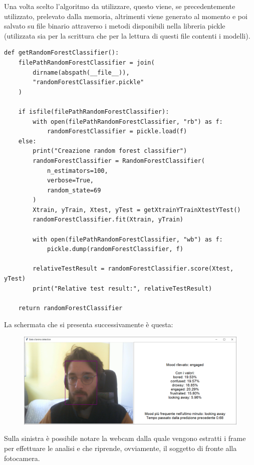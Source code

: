 Una volta scelto l’algoritmo da utilizzare, questo viene, se precedentemente utilizzato, prelevato dalla memoria, altrimenti viene generato al momento e poi salvato su file binario attraverso i metodi disponibili nella libreria pickle (utilizzata sia per la scrittura che per la lettura di questi file contenti i modelli).
\begin{verbatim}
def getRandomForestClassifier():
    filePathRandomForestClassifier = join(
        dirname(abspath(__file__)), 
        "randomForestClassifier.pickle"
    )

    if isfile(filePathRandomForestClassifier):
        with open(filePathRandomForestClassifier, "rb") as f:
            randomForestClassifier = pickle.load(f)
    else:
        print("Creazione random forest classifier")
        randomForestClassifier = RandomForestClassifier(
            n_estimators=100, 
            verbose=True, 
            random_state=69
        )
        Xtrain, yTrain, Xtest, yTest = getXtrainYTrainXtestYTest()
        randomForestClassifier.fit(Xtrain, yTrain)

        with open(filePathRandomForestClassifier, "wb") as f:
            pickle.dump(randomForestClassifier, f)
        
        relativeTestResult = randomForestClassifier.score(Xtest, yTest)
        print("Relative test result:", relativeTestResult)

    return randomForestClassifier
\end{verbatim}
La schermata che si presenta successivamente è questa:
\begin{figure}
    \begin{center}    
        \includegraphics[width=0.9\linewidth]{images/image52.png}
    \end{center}
\end{figure}

Sulla sinistra è possibile notare la webcam dalla quale vengono estratti i frame per effettuare le analisi e che riprende, ovviamente, il soggetto di fronte alla fotocamera.

